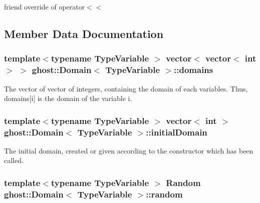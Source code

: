 friend override of operator$<$$<$ 



\subsection{Member Data Documentation}
\hypertarget{classghost_1_1Domain_a6940f37aa773c6c94cff18cfe1e6a7f7}{
\subsubsection[{domains}]{\setlength{\rightskip}{0pt plus 5cm}template$<$typename Type\-Variable $>$ vector$<$ vector$<$ int $>$ $>$ {\bf ghost\-::\-Domain}$<$ Type\-Variable $>$\-::domains\hspace{0.3cm}{\ttfamily [protected]}}}\label{classghost_1_1Domain_a6940f37aa773c6c94cff18cfe1e6a7f7}


The vector of vector of integers, containing the domain of each variables. Thus, domains\mbox{[}i\mbox{]} is the domain of the variable i. 

\hypertarget{classghost_1_1Domain_a8890ca1323c293a4a1e2aa1830eff043}{
\subsubsection[{initial\-Domain}]{\setlength{\rightskip}{0pt plus 5cm}template$<$typename Type\-Variable $>$ vector$<$ int $>$ {\bf ghost\-::\-Domain}$<$ Type\-Variable $>$\-::initial\-Domain\hspace{0.3cm}{\ttfamily [protected]}}}\label{classghost_1_1Domain_a8890ca1323c293a4a1e2aa1830eff043}


The initial domain, created or given according to the constructor which has been called. 

\hypertarget{classghost_1_1Domain_ab6a7a58f8a147f5b2b475e106627fad2}{
\subsubsection[{random}]{\setlength{\rightskip}{0pt plus 5cm}template$<$typename Type\-Variable $>$ {\bf Random} {\bf ghost\-::\-Domain}$<$ Type\-Variable $>$\-::random\hspace{0.3cm}{\ttfamily [protected]}}}\label{classghost_1_1Domain_ab6a7a58f8a147f5b2b475e106627fad2}


